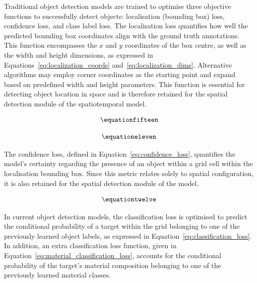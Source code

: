 \documentclass[12pt,a4paper,oneside]{report}
\begin{document}
Traditional object detection models are trained to optimise three objective functions to successfully detect objects: localisation (bounding box) loss, confidence loss, and class label loss. The localisation loss quantifies how well the predicted bounding box coordinates align with the ground truth annotations. This function encompasses the $x$ and $y$ coordinates of the box centre, as well as the width and height dimensions, as expressed in Equations~\ref{eq:localization_coords} and~\ref{eq:localization_dims}. Alternative algorithms may employ corner coordinates as the starting point and expand based on predefined width and height parameters. This function is essential for detecting object location in space and is therefore retained for the spatial detection module of the spatiotemporal model.

\begin{equation}
\label{eq:localization_coords}
\equationfifteen
\end{equation}

\begin{equation}
\label{eq:localization_dims}
\equationeleven
\end{equation}

The confidence loss, defined in Equation~\ref{eq:confidence_loss}, quantifies the model's certainty regarding the presence of an object within a grid cell within the localisation bounding box. Since this metric relates solely to spatial configuration, it is also retained for the spatial detection module of the model.

\begin{equation}
\label{eq:confidence_loss}
\equationtwelve
\end{equation}

In current object detection models, the classification loss is optimised to predict the conditional probability of a target within the grid belonging to one of the previously learned object labels, as expressed in Equation~\ref{eq:classification_loss}. In addition, an extra classification loss function, given in Equation~\ref{eq:material_classification_loss}, accounts for the conditional probability of the target's material composition belonging to one of the previously learned material classes.
\end{document}

